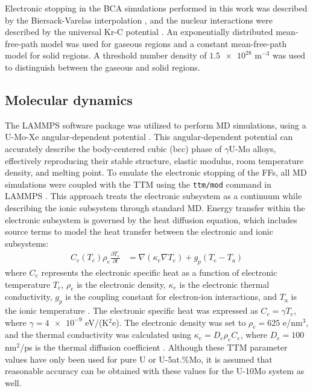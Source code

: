 \documentclass[review]{elsarticle}
\begin{document}
Electronic stopping in the BCA simulations performed in this work was described by the Biersack-Varelas interpolation \cite{varelas1970}, and the nuclear interactions were described by the universal Kr-C potential \cite{moller1984, eckstein2013}. An exponentially distributed mean-free-path model was used for gaseous regions and a constant mean-free-path model for solid regions. A threshold number density of $\num{1.5e28}$ m$^{-3}$ was used to distinguish between the gaseous and solid regions.

\subsection{Molecular dynamics}

The LAMMPS software package \cite{lammps} was utilized to perform MD simulations, using a U-Mo-Xe angular-dependent potential \cite{smirnova2013, starikov2018, beelerADP}. This angular-dependent potential can accurately describe the body-centered cubic (bcc) phase of $\gamma$U-Mo alloys, effectively reproducing their stable structure, elastic modulus, room temperature density, and melting point. To emulate the electronic stopping of the FFs, all MD simulations were coupled with the TTM using the \texttt{ttm/mod} command in LAMMPS \cite{norman2013, pisarev2014}. This approach treats the electronic subsystem as a continuum while describing the ionic subsystem through standard MD. Energy transfer within the electronic subsystem is governed by the heat diffusion equation, which includes source terms to model the heat transfer between the electronic and ionic subsystems:
\begin{align}
	C_e (T_e) \rho_e \frac{\partial T_e}{\partial t}
		&= \nabla (\kappa_e \nabla T_e) + g_p (T_e - T_a)
\end{align}
where $C_e$ represents the electronic specific heat as a function of electronic temperature $T_e$, $\rho_e$ is the electronic density, $\kappa_e$ is the electronic thermal conductivity, $g_p$ is the coupling constant for electron-ion interactions, and $T_a$ is the ionic temperature \cite{duffy2006, rutherford2007}. The electronic specific heat was expressed as $C_e = \gamma T_e$, where $\gamma = \num{4e-9}$ eV/(K$^2$e). The electronic density was set to $\rho_e = 625$ e/nm$^3$, and the thermal conductivity was calculated using $\kappa_e = D_e \rho_e C_e$, where $D_e = 100$ nm$^2$/ps is the thermal diffusion coefficient \cite{li2017, kolotova2017}. Although these TTM parameter values have only been used for pure U or U-5at.\%Mo, it is assumed that reasonable accuracy can be obtained with these values for the U-10Mo system as well.
\end{document}
